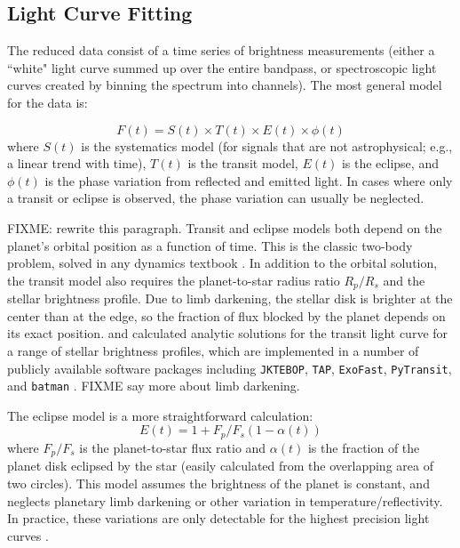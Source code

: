 \documentclass[graybox,natbib,nosecnum]{svmult}
\begin{document}
\subsection{Light Curve Fitting} 
The reduced data consist of a time series of brightness measurements (either a ``white" light curve summed up over the entire bandpass, or spectroscopic light curves created by binning the spectrum into channels).  The most general model for the data is:

\begin{equation}
F(t) = S(t) \times T(t) \times E(t) \times \phi(t)
\end{equation}
where $S(t)$ is the systematics model (for signals that are not astrophysical; e.g., a linear trend with time), $T(t)$ is the transit model, $E(t)$ is the eclipse, and $\phi(t)$ is the phase variation from reflected and emitted light. In cases where only a transit or eclipse is observed, the phase variation can usually be neglected.

FIXME: rewrite this paragraph. Transit and eclipse models both depend on the planet's orbital position as a function of time. This is the classic two-body problem, solved in any dynamics textbook \citep[e.g.][]{murray99}. In addition to the orbital solution, the transit model also requires the planet-to-star radius ratio $R_p/R_s$ and the stellar brightness profile. Due to limb darkening, the stellar disk is brighter at the center than at the edge, so the fraction of flux blocked by the planet depends on its exact position.  \cite{mandel02} and \cite{gimenez06} calculated analytic solutions for the transit light curve for a range of stellar brightness profiles,  which are implemented in a number of publicly available software packages including \texttt{JKTEBOP}, \texttt{TAP}, \texttt{ExoFast}, \texttt{PyTransit}, and \texttt{batman} \citep{southworth04, gazak12, eastman13, parviainen15, kreidberg15a}.  FIXME say more about limb darkening.

The eclipse model is a more straightforward calculation: 
\begin{equation}
E(t) = 1 + F_p/F_s (1 - \alpha(t)) 
\end{equation}
where $F_p/F_s$ is the planet-to-star flux ratio and $\alpha(t)$ is the fraction of the planet disk eclipsed by the star (easily calculated from the overlapping area of two circles). This model assumes the brightness of the planet is constant, and neglects planetary limb darkening or other variation in temperature/reflectivity. In practice, these variations are only detectable for the highest precision light curves \citep{FIXME}. 
\end{document}
